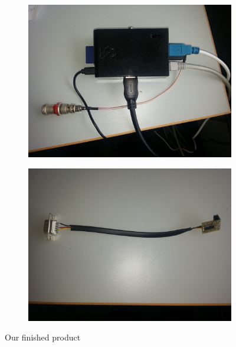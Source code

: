 \begin{figure}
\begin{subfigure}{.5\textwidth}
	\centering
	\includegraphics[width=\textwidth]{Figures/rasp-1}
\end{subfigure}
\begin{subfigure}{.5\textwidth}
	\centering
	\includegraphics[width=\textwidth]{Figures/rasp-2}
\end{subfigure}
\caption{Our finished product}
\label{fig:raspferdig}
\end{figure}
